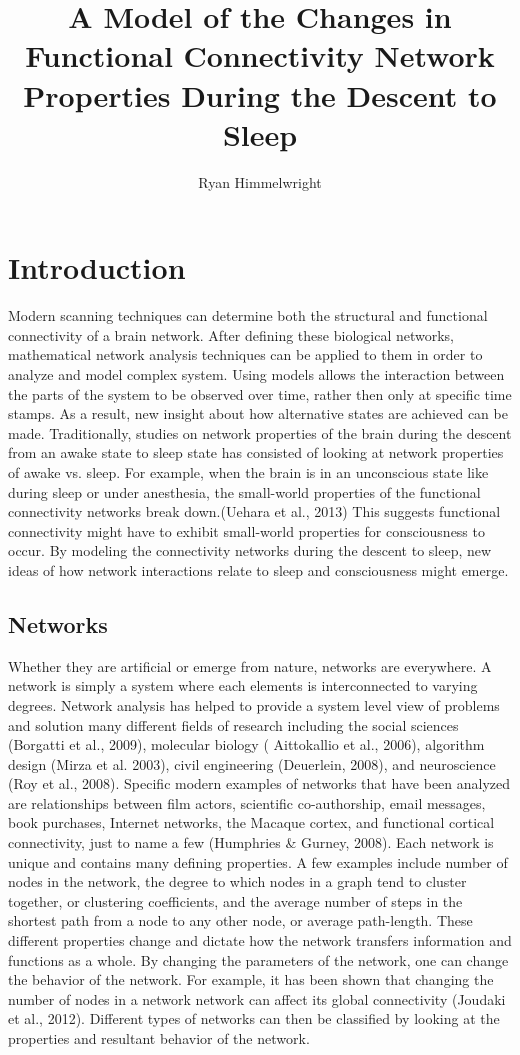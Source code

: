\documentclass[12pt,letterpaper]{report}
\author{Ryan Himmelwright}
\title{A Model of  the Changes in Functional Connectivity Network Properties During the Descent to Sleep}
\begin{document}
\maketitle
\chapter{Introduction}
        Modern scanning techniques can determine both the structural and functional connectivity of a brain network. After defining these biological networks, mathematical network analysis techniques can be applied to them in order to analyze and model complex system. Using models allows the interaction between the parts of the system to be observed over time, rather then only at specific time stamps. As a result, new insight about how alternative states are achieved can be made. Traditionally, studies on network properties of the brain during the descent from an awake state to sleep state has consisted of looking at network properties of awake vs. sleep. For example, when the brain is in an unconscious state like during sleep or under anesthesia, the small-world properties of the functional connectivity networks break down.(Uehara et al., 2013) This suggests functional connectivity might have to exhibit small-world properties for consciousness to occur. By modeling the connectivity networks during the descent to sleep, new ideas of how network interactions relate to sleep and consciousness might emerge.
\section{Networks}
        Whether they are artificial or emerge from nature, networks are everywhere. A network is simply a system where each elements is interconnected to varying degrees. Network analysis has helped to provide a system level view of problems and solution many different fields of research including the social sciences (Borgatti et al., 2009), molecular biology ( Aittokallio et al., 2006), algorithm design (Mirza et al. 2003), civil engineering (Deuerlein, 2008), and neuroscience (Roy et al., 2008). Specific modern examples of networks that have been analyzed are relationships between film actors, scientific co-authorship, email messages, book purchases, Internet networks, the Macaque cortex, and functional cortical connectivity, just to name a few (Humphries & Gurney, 2008).
        Each network is unique and contains many defining properties. A few examples include number of nodes in the network, the degree to which nodes in a graph tend to cluster together, or  clustering coefficients, and the average number of steps in the shortest path from a node to any other node, or average path-length. These different properties change and dictate how the network transfers information and functions as a whole. By changing the parameters of the network, one can change the behavior of the network. For example, it has been shown that changing the number of nodes in a network network can affect its global connectivity (Joudaki et al., 2012). Different types of networks can then be classified by looking at the properties and resultant behavior of the network.
\end{document}
